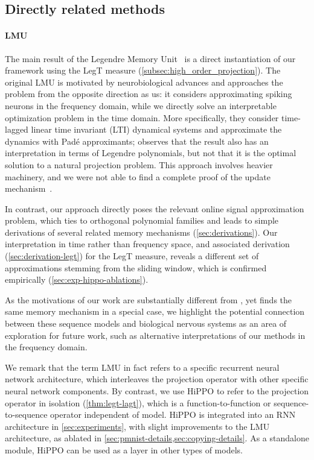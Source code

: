 \documentclass[../hippo.tex]{subfiles}
\begin{document}
\subsection{Directly related methods}

\paragraph{LMU}
The main result of the Legendre Memory Unit~\citep{voelker2018improving,voelker2019dynamical,voelker2019legendre} is a direct instantiation of our framework using the LegT measure (\cref{subsec:high_order_projection}).
The original LMU is motivated by neurobiological advances and approaches the problem from the opposite direction as us:
it considers approximating spiking neurons in the frequency domain, while we directly solve an interpretable optimization problem in the time domain.
More specifically, they consider time-lagged linear time invariant (LTI) dynamical systems and approximate the dynamics with Pad{\'e} approximants;
\citet{voelker2019legendre} observes that the result also has an interpretation in terms of Legendre polynomials,
but not that it is the optimal solution to a natural projection problem.
This approach involves heavier machinery, and we were not able to find a complete proof of the update mechanism~\citep{voelker2018improving,voelker2019dynamical,voelker2019legendre}.

In contrast, our approach directly poses the relevant online signal approximation problem, which ties to orthogonal polynomial families and leads to simple derivations of several related memory mechanisms (\cref{sec:derivations}). %
Our interpretation in time rather than frequency space, and associated derivation (\cref{sec:derivation-legt}) for the LegT measure, reveals a different set of approximations stemming from the sliding window,
which is confirmed empirically (\cref{sec:exp-hippo-ablations}).

As the motivations of our work are substantially different from \citet{voelker2019legendre}, yet finds the same memory mechanism in a special case,
we highlight the potential connection between these sequence models and biological nervous systems as an area of exploration for future work, such as alternative interpretations of our methods in the frequency domain.

We remark that the term LMU in fact refers to a specific recurrent neural network architecture, which interleaves the projection operator with other specific neural network components.
By contrast, we use HiPPO to refer to the projection operator in isolation (\cref{thm:legt-lagt}), which is a function-to-function or sequence-to-sequence operator independent of model.
HiPPO is integrated into an RNN architecture in \cref{sec:experiments}, with slight improvements to the LMU architecture, as ablated in \cref{sec:pmnist-details,sec:copying-details}.
As a standalone module, HiPPO can be used as a layer in other types of models.
\end{document}
